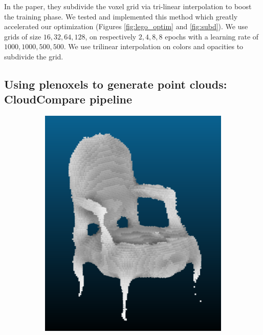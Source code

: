 \documentclass{article}
\begin{document}
In the paper, they subdivide the voxel grid via tri-linear interpolation to boost the training phase. We tested and implemented this method which greatly accelerated our optimization (Figures \ref{fig:lego_optim} and \ref{fig:subd}). We use grids of size ${16, 32, 64, 128}$, on respectively ${2, 4, 8, 8}$ epochs with a learning rate of ${1000, 1000, 500, 500}$. We use trilinear interpolation on colors and opacities to subdivide the grid.



\subsection{Using plenoxels to generate point clouds: CloudCompare pipeline}


\begin{figure}[!h]
 \centering
\begin{subfigure}{.24\textwidth}
  \centering
  \includegraphics[width=\linewidth]{figs/pc/chair.png}  
\end{subfigure}
\begin{subfigure}{.24\textwidth}

\end{subfigure}
\end{figure}
\end{document}
